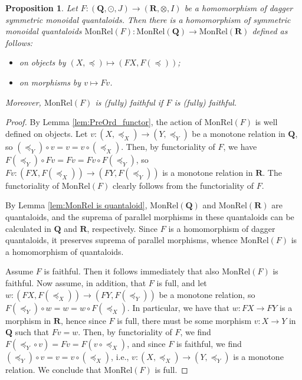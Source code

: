 \documentclass[12pt]{tac}
\newtheorem{proposition}[theorem]{Proposition}
\theoremstyle{definition}
\theoremstyle{remark}
\newcommand{\qo}{{\boldsymbol{\preccurlyeq}}}
\newcommand{\<}{\langle}
\renewcommand{\>}{\rangle}
\renewcommand{\:}{\colon}
\begin{document}
\begin{proposition}\label{prop:MonRel-functor}
Let $F:(\mathbf Q,\odot,J)\to(\mathbf R,\otimes,I)$ be a homomorphism of dagger symmetric monoidal quantaloids. Then there is a homomorphism of symmetric monoidal quantaloids $\mathrm{MonRel}(F):\mathrm{MonRel}(\mathbf Q)\to\mathrm{MonRel}(\mathbf R)$ defined as follows: 
\begin{itemize}
    \item on objects by $(X,\qo)\mapsto (FX,F(\qo))$;
    \item on morphisms by $v\mapsto Fv$.
\end{itemize}
Moreover, $\mathrm{MonRel}(F)$ is (fully) faithful if $F$ is (fully) faithful.
\end{proposition}
\begin{proof}
By Lemma \ref{lem:PreOrd_functor}, the action of $\mathrm{MonRel}(F)$ is well defined on objects. Let $v:(X,\qo_X)\to(Y,\qo_Y)$ be a monotone relation in $\mathbf Q$, so $(\qo_Y)\circ v=v=v\circ(\qo_X)$. Then, by functoriality of $F$, we have $F(\qo_Y)\circ Fv=Fv=Fv\circ F(\qo_Y)$, so $Fv:(FX,F(\qo_X))\to (FY,F(\qo_Y))$ is a monotone relation in $\mathbf R$. The functoriality of $\mathrm{MonRel}(F)$ clearly follows from the functoriality of $F$. 

By Lemma \ref{lem:MonRel is quantaloid}, $\mathrm{MonRel}(\mathbf Q)$ and $\mathrm{MonRel}(\mathbf R)$ are quantaloids, and the suprema of parallel morphisms in these quantaloids can be calculated in $\mathbf Q$ and $\mathbf R$, respectively. Since $F$ is a homomorphism of dagger quantaloids, it preserves suprema of parallel morphisms, whence $\mathrm{MonRel}(F)$ is a homomorphism of quantaloids.

Assume $F$ is faithful. Then it follows immediately that also $\mathrm{MonRel}(F)$ is faithful. Now assume, in addition, that $F$ is full, and let $w:(FX,F(\qo_X))\to(FY,F(\qo_Y))$ be a monotone relation, so $F(\qo_Y)\circ w=w=w\circ F(\qo_X)$. In particular, we have that $w:FX\to FY$ is a morphism in $\mathbf R$, hence since $F$ is full, there must be some morphism $v:X\to Y$ in $\mathbf Q$ such that $Fv=w$. Then, by functoriality of $F$, we find $F(\qo_Y\circ v)=Fv=F(v\circ\qo_X)$, and since $F$ is faithful, we find $(\qo_Y)\circ v=v=v\circ(\qo_X)$, i.e., $v:(X,\qo_X)\to(Y,\qo_Y)$ is a monotone relation. We conclude that $\mathrm{MonRel}(F)$ is full.


\end{proof}
\end{document}
